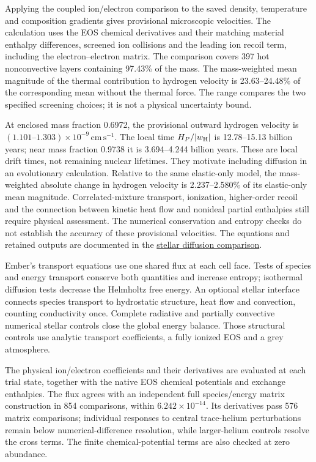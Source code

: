 \documentclass[11pt,letterpaper]{article}
\newcommand{\doc}[2]{\href{https://github.com/oklo/ember/blob/codex/atmosphere5000-density-checks/#1}{#2}}
\begin{document}
Applying the coupled ion/electron comparison to the saved density,
temperature and composition gradients gives provisional microscopic velocities.
The calculation uses the EOS chemical derivatives and their matching material
enthalpy differences, screened ion collisions and the leading ion recoil
term, including the electron--electron matrix. The comparison covers 397 hot
nonconvective layers containing 97.43\% of the mass. The mass-weighted mean
magnitude of the thermal contribution to hydrogen velocity is 23.63--24.48\%
of the corresponding mean without the thermal force. The range compares
the two specified screening choices; it is not a physical uncertainty bound.

At enclosed mass fraction 0.6972, the provisional outward hydrogen velocity
is $(1.101\text{--}1.303)\times10^{-9}\,\mathrm{cm\,s^{-1}}$.
The local time $H_P/|w_{\rm H}|$ is 12.78--15.13 billion years;
near mass fraction 0.9738 it is 3.694--4.244 billion years.
These are local drift times, not remaining nuclear lifetimes. They motivate
including diffusion in an evolutionary calculation. Relative to the same
elastic-only model, the mass-weighted absolute change in hydrogen velocity
is 2.237--2.580\% of its elastic-only mean magnitude.
Correlated-mixture transport, ionization, higher-order
recoil and the connection between kinetic heat flow and nonideal partial
enthalpies still require physical assessment. The numerical conservation and entropy checks do not
establish the accuracy of these provisional velocities.
The equations and retained outputs are documented in the
\doc{docs/ELECTRON_PAIR_TABLE.md}{stellar diffusion comparison}.

Ember's transport equations use one shared flux at each cell face. Tests of
species and energy transport conserve both quantities and increase entropy;
isothermal diffusion tests decrease the Helmholtz free energy. An optional
stellar interface connects species transport to hydrostatic structure, heat
flow and convection, counting conductivity once. Complete radiative and
partially convective numerical stellar controls close the global energy
balance. Those structural controls use analytic transport coefficients,
a fully ionized EOS and a grey atmosphere.

The physical ion/electron coefficients and their derivatives are evaluated
at each trial state, together with the native EOS chemical potentials and
exchange enthalpies. The flux agrees with an independent full species/energy
matrix construction in 854 comparisons, within $6.242\times10^{-14}$.
Its derivatives pass 576 matrix comparisons; individual responses to central
trace-helium perturbations remain below numerical-difference resolution,
while larger-helium controls resolve the cross terms. The finite
chemical-potential terms are also checked at zero abundance.
\end{document}
